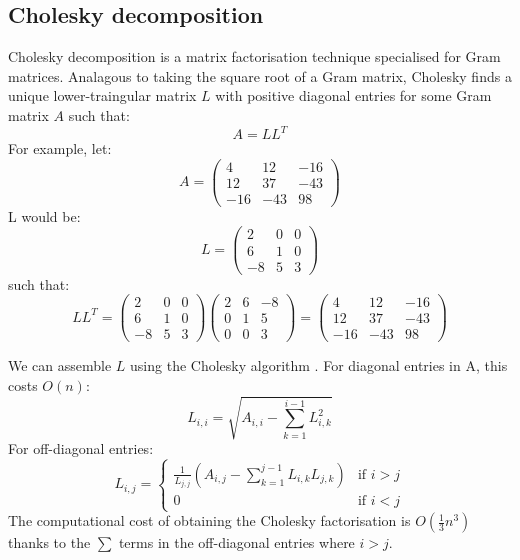 \subsection{Cholesky decomposition}
Cholesky decomposition \cite{gp-ml} is a matrix factorisation technique specialised for Gram matrices. Analagous to taking the square root of a Gram matrix, Cholesky finds a unique lower-traingular matrix $L$ with positive diagonal entries for some Gram matrix $A$ such that:
\begin{equation} \label{eq:cholesky-factor}
    A = LL^T
\end{equation}
For example, let:
\begin{equation*}
    A = \begin{pmatrix}
        4 & 12 & -16 \\ 
        12 & 37 & -43 \\
        -16 & -43 & 98
    \end{pmatrix}
\end{equation*}
L would be:
\begin{equation*}
    L = \begin{pmatrix}
        2 & 0 & 0 \\
        6 & 1 & 0 \\
        -8 & 5 & 3 
    \end{pmatrix}
\end{equation*}
such that:
\begin{equation*}
    LL^T = \begin{pmatrix}
        2 & 0 & 0 \\
        6 & 1 & 0 \\
        -8 & 5 & 3 
    \end{pmatrix} \begin{pmatrix}
        2 & 6 & -8 \\
        0 & 1 & 5 \\
        0 & 0 & 3 
    \end{pmatrix} = \begin{pmatrix}
        4 & 12 & -16 \\ 
        12 & 37 & -43 \\
        -16 & -43 & 98
    \end{pmatrix}
\end{equation*}

We can assemble $L$ using the Cholesky algorithm \cite{big-data}. For diagonal entries in A, this costs $O(n)$:
\begin{equation*}
    L_{i,i} = \sqrt{A_{i,i} - \sum_{k=1}^{i-1} L_{i,k}^2}
\end{equation*}
For off-diagonal entries:
\begin{equation*}
    L_{i,j} = \begin{cases}
        \frac{1}{L_{j,j}} \left( A_{i,j} - \sum_{k=1}^{j-1} L_{i,k} L_{j,k} \right) & \text{if } i > j \\
        0 & \text{if } i < j
    \end{cases}
\end{equation*}
The computational cost of obtaining the Cholesky factorisation is $O(\frac{1}{3} n^3)$ thanks to the $\sum$ terms in the off-diagonal entries where $i > j$.

